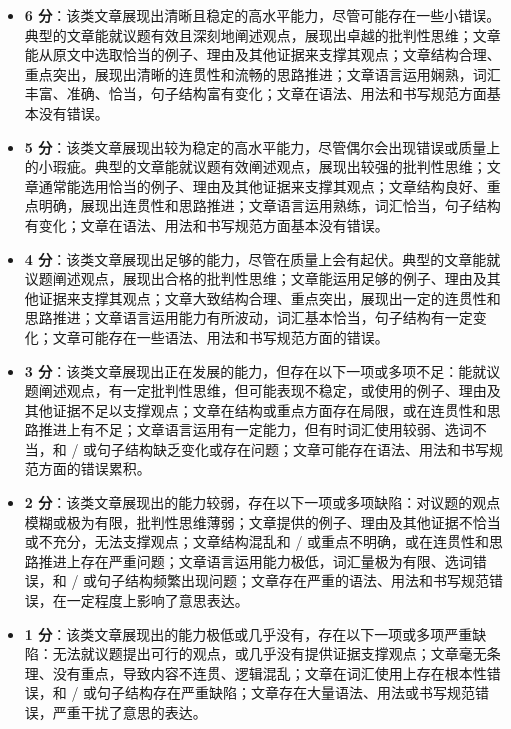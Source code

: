 \begin{itemize}
\item[\textbullet] 
\textbf{6 分}：该类文章展现出清晰且稳定的高水平能力，尽管可能存在一些小错误。典型的文章能就议题有效且深刻地阐述观点，展现出卓越的批判性思维；文章能从原文中选取恰当的例子、理由及其他证据来支撑其观点；文章结构合理、重点突出，展现出清晰的连贯性和流畅的思路推进；文章语言运用娴熟，词汇丰富、准确、恰当，句子结构富有变化；文章在语法、用法和书写规范方面基本没有错误。

\item[\textbullet] 
\textbf{5 分}：该类文章展现出较为稳定的高水平能力，尽管偶尔会出现错误或质量上的小瑕疵。典型的文章能就议题有效阐述观点，展现出较强的批判性思维；文章通常能选用恰当的例子、理由及其他证据来支撑其观点；文章结构良好、重点明确，展现出连贯性和思路推进；文章语言运用熟练，词汇恰当，句子结构有变化；文章在语法、用法和书写规范方面基本没有错误。

\item[\textbullet] 
\textbf{4 分}：该类文章展现出足够的能力，尽管在质量上会有起伏。典型的文章能就议题阐述观点，展现出合格的批判性思维；文章能运用足够的例子、理由及其他证据来支撑其观点；文章大致结构合理、重点突出，展现出一定的连贯性和思路推进；文章语言运用能力有所波动，词汇基本恰当，句子结构有一定变化；文章可能存在一些语法、用法和书写规范方面的错误。

\item[\textbullet] 
\textbf{3 分}：该类文章展现出正在发展的能力，但存在以下一项或多项不足：能就议题阐述观点，有一定批判性思维，但可能表现不稳定，或使用的例子、理由及其他证据不足以支撑观点；文章在结构或重点方面存在局限，或在连贯性和思路推进上有不足；文章语言运用有一定能力，但有时词汇使用较弱、选词不当，和 / 或句子结构缺乏变化或存在问题；文章可能存在语法、用法和书写规范方面的错误累积。

\item[\textbullet] 
\textbf{2 分}：该类文章展现出的能力较弱，存在以下一项或多项缺陷：对议题的观点模糊或极为有限，批判性思维薄弱；文章提供的例子、理由及其他证据不恰当或不充分，无法支撑观点；文章结构混乱和 / 或重点不明确，或在连贯性和思路推进上存在严重问题；文章语言运用能力极低，词汇量极为有限、选词错误，和 / 或句子结构频繁出现问题；文章存在严重的语法、用法和书写规范错误，在一定程度上影响了意思表达。

\item[\textbullet] 
\textbf{1 分}：该类文章展现出的能力极低或几乎没有，存在以下一项或多项严重缺陷：无法就议题提出可行的观点，或几乎没有提供证据支撑观点；文章毫无条理、没有重点，导致内容不连贯、逻辑混乱；文章在词汇使用上存在根本性错误，和 / 或句子结构存在严重缺陷；文章存在大量语法、用法或书写规范错误，严重干扰了意思的表达。
\end{itemize}


